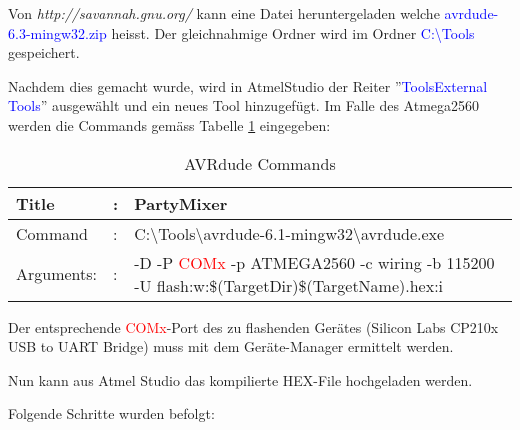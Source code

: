 Von \textit{http://savannah.gnu.org/} kann eine Datei heruntergeladen welche \textcolor{blue}{avrdude-6.3-mingw32.zip} heisst. Der gleichnahmige Ordner wird im Ordner \textcolor{blue}{C:\textbackslash Tools} gespeichert. \cite{savannahgnuorg_index_2016}

Nachdem dies gemacht wurde, wird in AtmelStudio der Reiter ''\textcolor{blue}{Tools\textrightarrow External Tools}'' ausgewählt und ein neues Tool hinzugefügt. Im Falle des Atmega2560 werden die Commands gemäss Tabelle \ref{tab:AVRdude_commands} eingegeben:

\begin{table}[h!]
\center
\begin{tabularx}{\textwidth}{|l|l|X|}
\hline
Title & : & PartyMixer \\
\hline
Command & : & C:\textbackslash Tools\textbackslash avrdude-6.1-mingw32\textbackslash avrdude.exe \\
\hline
Arguments: & : & -D -P \textcolor{red}{ COMx} -p ATMEGA2560 -c wiring -b 115200 -U flash:w:\$(TargetDir)\$(TargetName).hex:i\\
\hline
\end{tabularx}
\caption{AVRdude Commands}
\label{tab:AVRdude_commands}
\end{table}

Der entsprechende \textcolor{red}{COMx}-Port des zu flashenden Gerätes (Silicon Labs CP210x USB to UART Bridge) muss mit dem Geräte-Manager ermittelt werden. \cite{meier_mc1-skript_2017}

Nun kann aus Atmel Studio das kompilierte HEX-File hochgeladen werden.

Folgende Schritte wurden befolgt:

